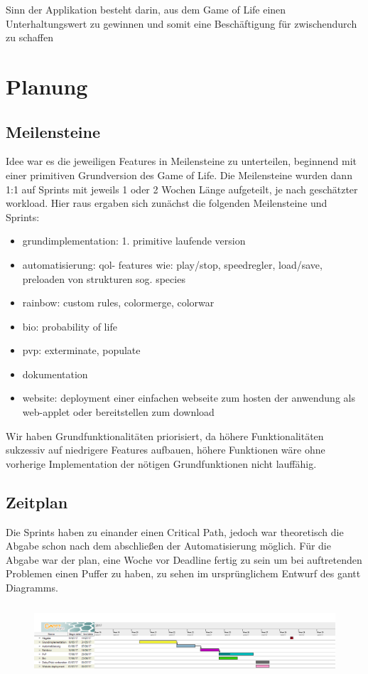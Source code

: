 \documentclass[12pt]{article}
\theoremstyle{plain}
\begin{document}
Sinn der Applikation besteht darin, aus dem Game of Life einen Unterhaltungswert zu gewinnen und somit eine Beschäftigung für zwischendurch zu schaffen

\section{Planung}

\subsection{Meilensteine}
Idee war es die jeweiligen Features in Meilensteine zu unterteilen, beginnend mit einer primitiven Grundversion des Game of Life. Die Meilensteine wurden dann 1:1 auf Sprints mit jeweils 1 oder 2 Wochen Länge aufgeteilt, je nach geschätzter workload.  Hier raus ergaben sich zunächst die folgenden Meilensteine und Sprints:
\begin{itemize}
\item
grundimplementation: 1. primitive laufende version
\item
automatisierung: qol- features wie: play/stop, speedregler, load/save, preloaden von strukturen sog. species
\item
rainbow: custom rules, colormerge, colorwar
\item
bio: probability of life
\item
pvp: exterminate, populate
\item
dokumentation
\item
website: deployment einer einfachen webseite zum hosten der anwendung als web-applet oder bereitstellen zum download
\end{itemize}

Wir haben Grundfunktionalitäten priorisiert, da höhere Funktionalitäten sukzessiv auf niedrigere Features aufbauen,
höhere Funktionen wäre ohne vorherige Implementation der nötigen Grundfunktionen nicht lauffähig.

\subsection{Zeitplan}
Die Sprints haben zu einander einen Critical Path, jedoch war theoretisch die Abgabe schon nach dem abschließen der Automatisierung möglich.
Für die Abgabe war der plan, eine Woche vor Deadline fertig zu sein um bei auftretenden Problemen einen Puffer zu haben, zu sehen im ursprünglichem Entwurf des gantt Diagramms.
\begin{figure}[ht]
\centering
\includegraphics[width=1\textwidth, height=100px]{images/ganttdep.png}
\end{figure}
\end{document}
